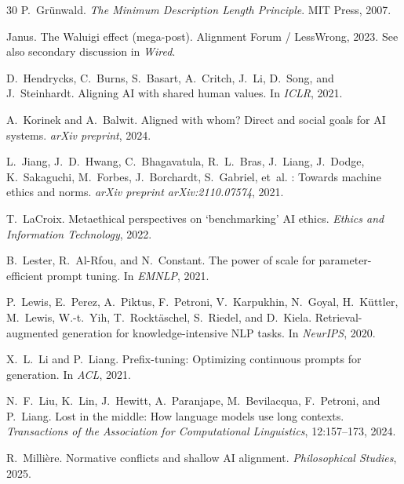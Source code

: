 \documentclass[preprint]{article}
\begin{document}
\begin{thebibliography}{30}
P.~Gr{\"u}nwald.
\newblock \emph{The Minimum Description Length Principle}.
\newblock MIT Press, 2007.

Janus.
\newblock The {W}aluigi effect (mega-post).
\newblock Alignment Forum / LessWrong, 2023.
\newblock See also secondary discussion in \emph{Wired}.

D.~Hendrycks, C.~Burns, S.~Basart, A.~Critch, J.~Li, D.~Song, and J.~Steinhardt.
\newblock Aligning {AI} with shared human values.
\newblock In \emph{ICLR}, 2021.

A.~Korinek and A.~Balwit.
\newblock Aligned with whom? {D}irect and social goals for {AI} systems.
\newblock \emph{arXiv preprint}, 2024.

L.~Jiang, J.~D.~Hwang, C.~Bhagavatula, R.~L.~Bras, J.~Liang, J.~Dodge, K.~Sakaguchi, M.~Forbes, J.~Borchardt, S.~Gabriel, et~al.
: Towards machine ethics and norms.
\newblock \emph{arXiv preprint arXiv:2110.07574}, 2021.

T.~LaCroix.
\newblock Metaethical perspectives on `benchmarking' {AI} ethics.
\newblock \emph{Ethics and Information Technology}, 2022.

B.~Lester, R.~Al-Rfou, and N.~Constant.
\newblock The power of scale for parameter-efficient prompt tuning.
\newblock In \emph{EMNLP}, 2021.

P.~Lewis, E.~Perez, A.~Piktus, F.~Petroni, V.~Karpukhin, N.~Goyal, H.~K{\"u}ttler, M.~Lewis, W.-t.~Yih, T.~Rockt{\"a}schel, S.~Riedel, and D.~Kiela.
\newblock Retrieval-augmented generation for knowledge-intensive {NLP} tasks.
\newblock In \emph{NeurIPS}, 2020.

X.~L.~Li and P.~Liang.
\newblock Prefix-tuning: Optimizing continuous prompts for generation.
\newblock In \emph{ACL}, 2021.

N.~F.~Liu, K.~Lin, J.~Hewitt, A.~Paranjape, M.~Bevilacqua, F.~Petroni, and P.~Liang.
\newblock Lost in the middle: How language models use long contexts.
\newblock \emph{Transactions of the Association for Computational Linguistics}, 12:157--173, 2024.

R.~Milli{\`e}re.
\newblock Normative conflicts and shallow {AI} alignment.
\newblock \emph{Philosophical Studies}, 2025.


\end{thebibliography}
\end{document}
